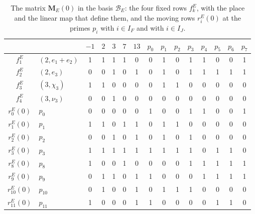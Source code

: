 \documentclass[12pt,oneside,openany]{book}
\theoremstyle{definition}
\theoremstyle{plain}
\numberwithin{equation}{chapter}
\theoremstyle{plain}
\theoremstyle{definition}
\theoremstyle{remark}
\newcommand{\cB}{\mathcal B}
\begin{document}
\begin{table}[htbp]
\centering
\caption{The matrix $\mathbf M_E(0)$ in the basis $\cB_E$: the four fixed
rows $f^E_k$, with the place and the linear map that define them, and the moving
rows $r^E_i(0)$ at the primes $p_i$ with $i\in I_F$ and with $i\in I_J$.}
\label{tab:r7-ME}
\small
\setlength{\tabcolsep}{4pt}
\begin{tabular}{cl@{\hspace{10pt}}ccccc@{\hspace{14pt}}cccccccc}
\toprule
 & & $-1$ & $2$ & $3$ & $7$ & $13$ & $p_0$ & $p_1$ & $p_2$ & $p_3$ & $p_4$ & $p_5$ & $p_6$ & $p_7$\\
\midrule
$f^E_1$ & $(2,e_1+e_2)$ & 1 & 1 & 1 & 1 & 0 & 0 & 1 & 0 & 1 & 1 & 0 & 0 & 1 \\
$f^E_2$ & $(2,e_3)$ & 0 & 0 & 1 & 0 & 1 & 0 & 1 & 0 & 1 & 1 & 1 & 1 & 1 \\
$f^E_3$ & $(3,\chi_3)$ & 1 & 1 & 0 & 0 & 0 & 0 & 1 & 1 & 0 & 0 & 0 & 0 & 0 \\
$f^E_4$ & $(3,\nu_3)$ & 0 & 0 & 1 & 0 & 0 & 0 & 0 & 0 & 0 & 0 & 0 & 0 & 0 \\
\addlinespace
$r^{E}_0(0)$ & $p_0$ & 0 & 0 & 0 & 0 & 0 & 1 & 0 & 0 & 1 & 1 & 0 & 0 & 1 \\
$r^{E}_1(0)$ & $p_1$ & 1 & 1 & 0 & 1 & 1 & 0 & 1 & 1 & 0 & 0 & 0 & 0 & 0 \\
$r^{E}_2(0)$ & $p_2$ & 0 & 0 & 1 & 0 & 1 & 0 & 1 & 0 & 1 & 0 & 0 & 0 & 0 \\
$r^{E}_3(0)$ & $p_3$ & 1 & 1 & 1 & 1 & 1 & 1 & 1 & 1 & 1 & 0 & 1 & 1 & 0 \\
\addlinespace
$r^{E}_8(0)$ & $p_8$ & 1 & 0 & 0 & 1 & 0 & 0 & 0 & 0 & 1 & 1 & 1 & 1 & 1 \\
$r^{E}_9(0)$ & $p_9$ & 0 & 1 & 1 & 0 & 1 & 1 & 0 & 0 & 0 & 1 & 1 & 1 & 1 \\
$r^{E}_{10}(0)$ & $p_{10}$ & 0 & 1 & 0 & 0 & 1 & 0 & 1 & 1 & 1 & 0 & 0 & 0 & 0 \\
$r^{E}_{11}(0)$ & $p_{11}$ & 1 & 0 & 0 & 0 & 1 & 1 & 0 & 0 & 0 & 0 & 1 & 1 & 0 \\
\bottomrule
\end{tabular}
\end{table}
\end{document}
